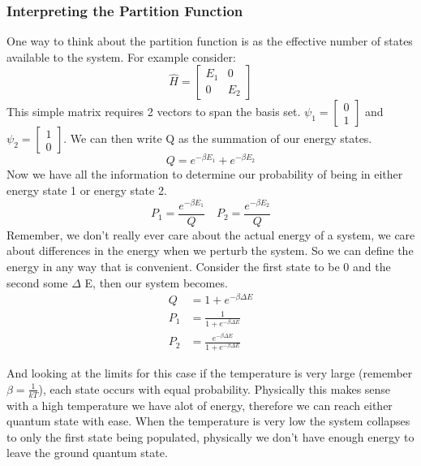 \documentclass{article}
\begin{document}
\subsubsection*{Interpreting the Partition Function}
One way to think about the partition function is  as the effective number of states available to the system. 
For example consider:
\begin{equation}
\hat{H} = \begin{bmatrix} E_1 & 0 \\ 0 & E_2 \end{bmatrix}
\end{equation}
This simple matrix requires 2 vectors to span the basis set. 
$\psi_1 = \left[ \begin{array}{c} 0 \\ 1 \end{array} \right ]$ and $\psi_2 = \left[ \begin{array}{c} 1 \\ 0 \end{array} \right ]$. 
We can then write Q as the summation of our energy states. 
\begin{equation}
Q = e^{-\beta E_1} + e^{-\beta E_2}
\end{equation}
Now we have all the information to determine our probability of being in either energy state 1 or energy state 2. 
\begin{equation}
P_1 = \frac{e^{-\beta E_1}}{Q} \quad P_2 = \frac{e^{-\beta E_2}}{Q}
\end{equation}
Remember, we don't really ever care about the actual energy of a system, we care about differences in the energy when we perturb the system.
So we can define the energy in any way that is convenient. 
Consider the first state to be 0  and the second some $\Delta$ E, then our system becomes.
\begin{equation}
    \begin{split}
        Q &= 1 + e^{-\beta \Delta E} \\
        P_1 &= \frac{1}{1+e^{-\beta \Delta E}}\\
        P_2 &= \frac{e^{-\beta \Delta E}}{1+e^{-\beta \Delta E}}
    \end{split}
\end{equation}

And looking at the limits for this case if the temperature is very large (remember $\beta = \frac{1}{kT}$), each state occurs with equal probability.
Physically this makes sense with a high temperature we have alot of energy, therefore we can reach either quantum state with ease.
When the temperature is very low the system collapses to only the first state being populated, physically we don't have enough energy to leave the ground quantum state. 
\end{document}

